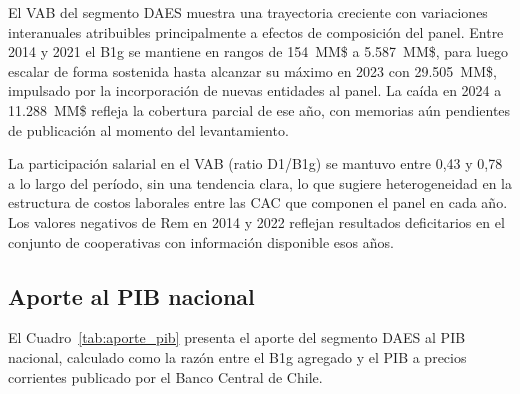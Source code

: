 El VAB del segmento DAES muestra una trayectoria creciente
con variaciones interanuales atribuibles principalmente a
efectos de composición del panel. Entre 2014 y 2021 el B1g
se mantiene en rangos de 154~MM\$ a 5.587~MM\$, para luego
escalar de forma sostenida hasta alcanzar su máximo en 2023
con 29.505~MM\$, impulsado por la incorporación de nuevas
entidades al panel. La caída en 2024 a 11.288~MM\$ refleja
la cobertura parcial de ese año, con memorias aún pendientes
de publicación al momento del levantamiento.

La participación salarial en el VAB (ratio D1/B1g) se mantuvo
entre 0{,}43 y 0{,}78 a lo largo del período, sin una
tendencia clara, lo que sugiere heterogeneidad en la estructura
de costos laborales entre las CAC que componen el panel en
cada año. Los valores negativos de Rem en 2014 y 2022
reflejan resultados deficitarios en el conjunto de
cooperativas con información disponible esos años.

\subsection{Aporte al PIB nacional}
\label{subsec:aporte-pib-daes}
El Cuadro~\ref{tab:aporte_pib} presenta el aporte del
segmento DAES al PIB nacional, calculado como la razón
entre el B1g agregado y el PIB a precios corrientes
publicado por el Banco Central de Chile.

